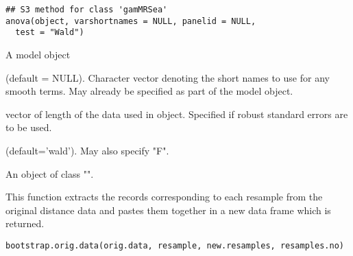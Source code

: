 \documentclass[a4paper]{book}
\begin{document}
%
\begin{Usage}
\begin{verbatim}
## S3 method for class 'gamMRSea'
anova(object, varshortnames = NULL, panelid = NULL,
  test = "Wald")
\end{verbatim}
\end{Usage}
%
\begin{Arguments}
\begin{ldescription}
\item[\code{object}] A  model object

\item[\code{varshortnames}] (default = NULL).  Character vector denoting the short names to use for any smooth terms.  May already be specified as part of the model object.

\item[\code{panelid}] vector of length of the data used in object.  Specified if robust standard errors are to be used.

\item[\code{test}] (default='wald'). May also specify "F".
\end{ldescription}
\end{Arguments}
%
\begin{Value}
An object of class "".
\end{Value}
%
\begin{Examples}
\end{Examples}
%
\begin{Description}\relax
This function extracts the records corresponding to each resample from the original 
distance data and pastes them together in a new data frame which is returned.
\end{Description}
%
\begin{Usage}
\begin{verbatim}
bootstrap.orig.data(orig.data, resample, new.resamples, resamples.no)
\end{verbatim}
\end{Usage}
\end{document}
